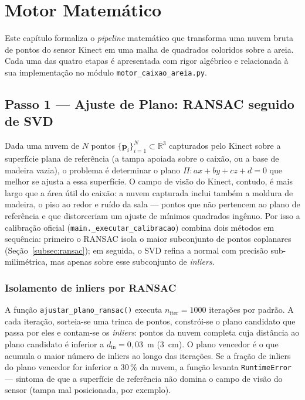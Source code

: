 
\chapter{Motor Matemático}
\label{cap:motor}

Este capítulo formaliza o \textit{pipeline} matemático que transforma
uma nuvem bruta de pontos do sensor Kinect em uma malha de quadrados
coloridos sobre a areia. Cada uma das quatro etapas é apresentada com
rigor algébrico e relacionada à sua implementação no módulo
\texttt{motor\_caixao\_areia.py}.

\section{Passo 1 — Ajuste de Plano: RANSAC seguido de SVD}
\label{sec:passo1}

Dada uma nuvem de $N$ pontos $\{\mathbf{p}_i\}_{i=1}^{N} \subset
\mathbb{R}^{3}$ capturados pelo Kinect sobre a superfície plana de
referência (a tampa apoiada sobre o caixão, ou a base de madeira vazia),
o problema é determinar o plano $\Pi: ax + by + cz + d = 0$ que melhor
se ajusta a essa superfície. O campo de visão do Kinect, contudo, é mais
largo que a área útil do caixão: a nuvem capturada inclui também a
moldura de madeira, o piso ao redor e ruído da sala — pontos que não
pertencem ao plano de referência e que distorceriam um ajuste de
mínimos quadrados ingênuo. Por isso a calibração oficial
(\texttt{main.\_executar\_calibracao}) combina dois métodos em
sequência: primeiro o RANSAC isola o maior subconjunto de
pontos coplanares (Seção~\ref{subsec:ransac}); em seguida, o
SVD refina a normal com precisão sub-milimétrica, mas apenas
sobre esse subconjunto de \emph{inliers}.

\subsection{Isolamento de inliers por RANSAC}

A função \texttt{ajustar\_plano\_ransac()} executa $n_{\text{iter}} =
1000$ iterações por padrão. A cada iteração, sorteia-se uma trinca de
pontos, constrói-se o plano candidato que passa por eles e contam-se os
\emph{inliers}: pontos da nuvem completa cuja distância ao plano
candidato é inferior a $d_{\text{in}} = 0{,}03$~m (3~cm). O plano
vencedor é o que acumula o maior número de inliers ao longo das
iterações. Se a fração de inliers do plano vencedor for inferior a
$30\,\%$ da nuvem, a função levanta \texttt{RuntimeError} — sintoma de
que a superfície de referência não domina o campo de visão do sensor
(tampa mal posicionada, por exemplo).

